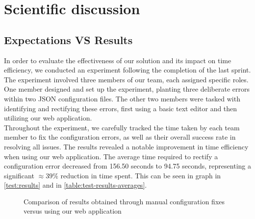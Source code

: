 \section{Scientific discussion}

\subsection{Expectations VS Results}
\label{sec:time_results}


In order to evaluate the effectiveness of our solution and its impact on time efficiency, we conducted an experiment following the completion of the last sprint. The experiment involved three members of our team, each assigned specific roles. One member designed and set up the experiment, planting three deliberate errors within two JSON configuration files. The other two members were tasked with identifying and rectifying these errors, first using a basic text editor and then utilizing our web application. \\

\noindent
Throughout the experiment, we carefully tracked the time taken by each team member to fix the configuration errors, as well as their overall success rate in resolving all issues. The results revealed a notable improvement in time efficiency when using our web application. The average time required to rectify a configuration error decreased from 156.50 seconds to 94.75 seconds, representing a significant $\approx 39\%$ reduction in time spent.
This can be seen in graph in \autoref{test:results} and in \autoref{table:test-results-averages}. \\


\newpage


\begin{figure}[!ht]
   \begin{minipage}{1\textwidth}
     \centering
     
     \caption[Experiment results graph]{Comparison of results obtained through manual configuration fixes versus using our web application}
     \label{test:results}
   \end{minipage}\hfill
\end{figure}


